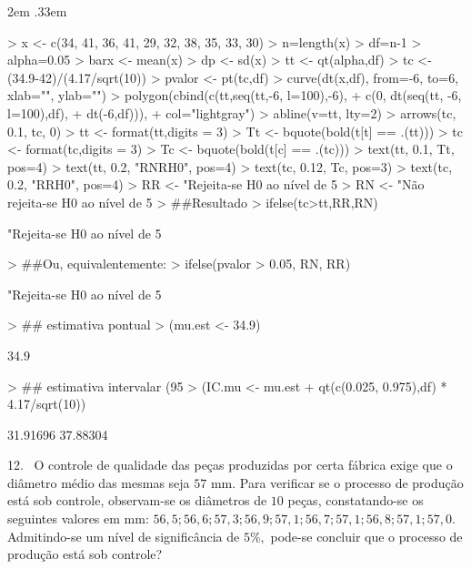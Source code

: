 \documentclass{article}
\newenvironment{ManualExercise}
  {\begin{list}{}{\leftmargin \QuestionIndent
    \partopsep0pt \parsep\parskip \topsep\QuestionBefore
    \itemsep\QuestionBefore \labelwidth2em
    \labelsep.33em
    \usecounter{Question}}}
  {\end{list}}
\begin{document}
\begin{Exercise}
\begin{ManualExercise}
\begin{Schunk}
\begin{Sinput}
> x <- c(34, 41, 36, 41, 29, 32, 38, 35, 33, 30)
> n=length(x)
> df=n-1
> alpha=0.05
> barx <- mean(x)
> dp <- sd(x)
> tt <- qt(alpha,df)
> tc <- (34.9-42)/(4.17/sqrt(10))
> pvalor <- pt(tc,df)
> curve(dt(x,df), from=-6, to=6, xlab="", ylab="")
> polygon(cbind(c(tt,seq(tt,-6, l=100),-6),
+               c(0, dt(seq(tt, -6, l=100),df),
+                 dt(-6,df))),
+         col="lightgray")
> abline(v=tt, lty=2)
> arrows(tc, 0.1, tc, 0)
> tt <- format(tt,digits = 3)
> Tt <- bquote(bold(t[t] == .(tt)))
> tc <- format(tc,digits = 3)
> Tc <- bquote(bold(t[c] == .(tc)))
> text(tt, 0.1, Tt, pos=4)
> text(tt, 0.2, "RNRH0", pos=4)
> text(tc, 0.12, Tc, pos=3)
> text(tc, 0.2, "RRH0", pos=4)
> RR <- "Rejeita-se H0 ao nível de 5%
> RN <- "Não rejeita-se H0 ao nível de 5%
> ##Resultado
> ifelse(tc>tt,RR,RN)
\end{Sinput}
\begin{Soutput}
[1] "Rejeita-se H0 ao nível de 5%
\end{Soutput}
\begin{Sinput}
> ##Ou, equivalentemente:
> ifelse(pvalor > 0.05, RN, RR)
\end{Sinput}
\begin{Soutput}
[1] "Rejeita-se H0 ao nível de 5%
\end{Soutput}
\begin{Sinput}
> ## estimativa pontual
> (mu.est <- 34.9)
\end{Sinput}
\begin{Soutput}
[1] 34.9
\end{Soutput}
\begin{Sinput}
> ## estimativa intervalar (95%
> (IC.mu <- mu.est + qt(c(0.025, 0.975),df) * 4.17/sqrt(10))
\end{Sinput}
\begin{Soutput}
[1] 31.91696 37.88304
\end{Soutput}
\end{Schunk}

\item[12.~]O controle de qualidade das peças produzidas por certa fábrica exige que o diâmetro médio das mesmas seja $57$ mm. Para verificar se o processo de produção está sob controle, observam-se os diâmetros de $10$ peças, constatando-se os seguintes valores em mm: $56,5; 56,6; 57,3; 56,9; 57,1; 56,7; 57,1; 56,8; 57,1; 57,0.$ Admitindo-se um nível de significância de $5\%,$ pode-se concluir que o processo de produção está sob controle?


\end{ManualExercise}
\end{Exercise}
\end{document}
